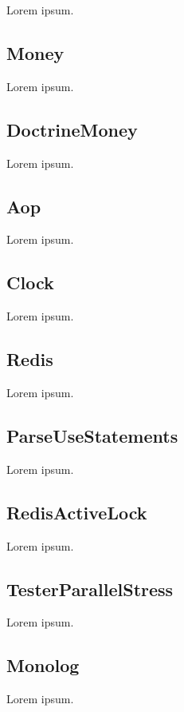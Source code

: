 Lorem ipsum.

\tocless\subsection{Money}

Lorem ipsum.

\tocless\subsection{DoctrineMoney}

Lorem ipsum.

\tocless\subsection{Aop}

Lorem ipsum.

\tocless\subsection{Clock}

Lorem ipsum.

\tocless\subsection{Redis}

Lorem ipsum.

\tocless\subsection{ParseUseStatements}

Lorem ipsum.

\tocless\subsection{RedisActiveLock}

Lorem ipsum.

\tocless\subsection{TesterParallelStress}

Lorem ipsum.

\tocless\subsection{Monolog}

Lorem ipsum.

